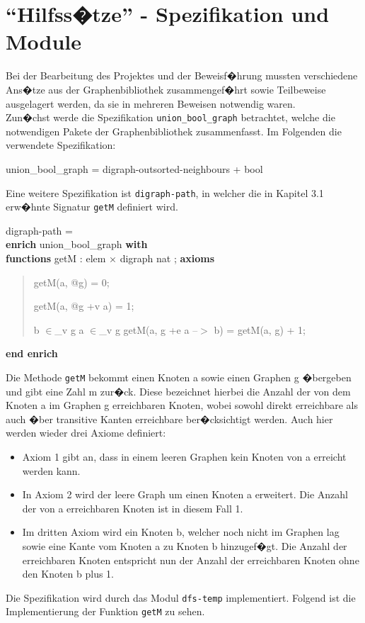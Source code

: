 ﻿\section{"`Hilfss�tze"' - Spezifikation und Module}
\label{sec:digraph-path}

Bei der Bearbeitung des Projektes und der Beweisf�hrung mussten verschiedene Ans�tze aus der Graphenbibliothek zusammengef�hrt sowie Teilbeweise ausgelagert werden, da sie in mehreren Beweisen notwendig waren.\\
Zun�chst werde die Spezifikation \texttt{union\_bool\_graph} betrachtet, welche die notwendigen Pakete der Graphenbibliothek zusammenfasst. Im Folgenden die verwendete Spezifikation:

union\_bool\_graph = digraph-outsorted-neighbours + bool

Eine weitere Spezifikation ist \texttt{digraph-path}, in welcher die in Kapitel 3.1 erw�hnte Signatur \texttt{getM} definiert wird.

digraph-path = \\
{\bf enr}\={\bf ich} union\_bool\_graph {\bf with}\+\\
{\bf functions} getM  : elem $\times$ digraph \Imp  nat ;
{\bf axioms}

\begin{quote}
getM(a, @g) = 0;

getM(a, @g +v a) = 1;

\Not b $\in$\_v g \And a $\in$\_v g \Imp getM(a, g +e a --$>$ b) = getM(a, g) + 1;

\end{quote}
{\bf end enrich}

Die Methode \texttt{getM} bekommt einen Knoten a sowie einen Graphen g �bergeben und gibt eine Zahl m zur�ck. Diese bezeichnet hierbei die Anzahl der von dem Knoten a im Graphen g erreichbaren Knoten, wobei sowohl direkt erreichbare als auch �ber transitive Kanten erreichbare ber�cksichtigt werden. Auch hier werden wieder drei Axiome definiert:

\begin{itemize}
	\item Axiom 1 gibt an, dass in einem leeren Graphen kein Knoten von a erreicht werden kann.
	\item In Axiom 2 wird der leere Graph um einen Knoten a erweitert. Die Anzahl der von a erreichbaren Knoten ist in diesem Fall 1.
	\item Im dritten Axiom wird ein Knoten b, welcher noch nicht im Graphen lag sowie eine Kante vom Knoten a zu Knoten b hinzugef�gt. Die Anzahl der erreichbaren Knoten entspricht nun der Anzahl der erreichbaren Knoten ohne den Knoten b plus 1. 
\end{itemize}
Die Spezifikation wird durch das Modul \texttt{dfs-temp} implementiert. Folgend ist die Implementierung der Funktion \texttt{getM} zu sehen.

